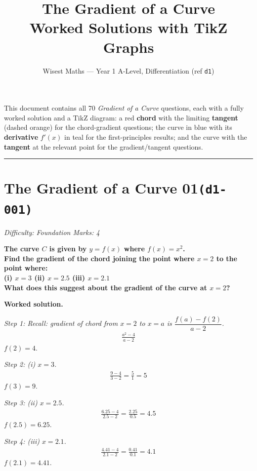 \documentclass[11pt]{article}
\title{\textbf{The Gradient of a Curve}\\[0.3em]\large Worked Solutions with TikZ Graphs}
\author{Wisest Maths --- Year 1 A-Level, Differentiation (ref \texttt{d1})}
\date{}
\newcommand{\question}[1]{\par\medskip\noindent\textbf{#1}\par}
\begin{document}
\maketitle
\noindent This document contains all 70 \emph{Gradient of a Curve} questions, each with a fully worked
solution and a TikZ diagram: a red \textbf{chord} with the limiting \textbf{tangent} (dashed orange) for the
chord-gradient questions; the curve in blue with its \textbf{derivative} $f'(x)$ in teal for the
first-principles results; and the curve with the \textbf{tangent} at the relevant point for the
gradient/tangent questions.
\tableofcontents
\bigskip
\hrule

\section*{The Gradient of a Curve 01\quad\small\texttt{(d1-001)}}
\textit{Difficulty: Foundation \quad\textbar\quad Marks: 4}

\question{The curve \( C \) is given by \( y = f(x) \) where \( f(x) = x^2 \).\\[3pt]  Find the gradient of the chord joining the point where \( x = 2 \) to the point where:\\[3pt]  (i) \( x = 3 \) \quad  (ii) \( x = 2.5 \) \quad  (iii) \( x = 2.1 \)\\[3pt]  What does this suggest about the gradient of the curve at \( x = 2 \)?}

\textbf{Worked solution.}

\textit{Step 1: Recall: gradient of chord from \( x = 2 \) to \( x = a \) is \( \dfrac{f(a) - f(2)}{a - 2} \).}
\[\begin{gathered}
\frac{a^2 - 4}{a - 2}
\end{gathered}\]
\( f(2) = 4 \).

\textit{Step 2: (i) \( x = 3 \).}
\[\begin{gathered}
\frac{9 - 4}{3 - 2} = \frac{5}{1} = 5
\end{gathered}\]
\( f(3) = 9 \).

\textit{Step 3: (ii) \( x = 2.5 \).}
\[\begin{gathered}
\frac{6.25 - 4}{2.5 - 2} = \frac{2.25}{0.5} = 4.5
\end{gathered}\]
\( f(2.5) = 6.25 \).

\textit{Step 4: (iii) \( x = 2.1 \).}
\[\begin{gathered}
\frac{4.41 - 4}{2.1 - 2} = \frac{0.41}{0.1} = 4.1
\end{gathered}\]
\( f(2.1) = 4.41 \).
\end{document}
